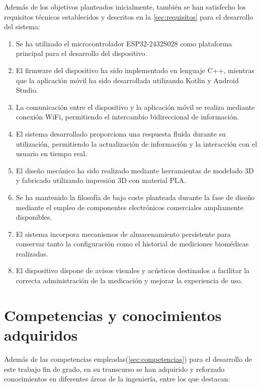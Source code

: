 Además de los objetivos planteados inicialmente, también se han satisfecho los requisitos técnicos establecidos y descritos en la \autoref{sec:requisitos} para el desarrollo del sistema:

\begin{enumerate}

\item Se ha utilizado el microcontrolador ESP32-2432S028 como plataforma principal para el desarrollo del dispositivo.

\item El firmware del dispositivo ha sido implementado en lenguaje C++, mientras que la aplicación móvil ha sido desarrollada utilizando Kotlin y Android Studio.

\item La comunicación entre el dispositivo y la aplicación móvil se realiza mediante conexión WiFi, permitiendo el intercambio bidireccional de información.

\item El sistema desarrollado proporciona una respuesta fluida durante su utilización, permitiendo la actualización de información y la interacción con el usuario en tiempo real.

\item El diseño mecánico ha sido realizado mediante herramientas de modelado 3D y fabricado utilizando impresión 3D con material PLA.

\item Se ha mantenido la filosofía de bajo coste planteada durante la fase de diseño mediante el empleo de componentes electrónicos comerciales ampliamente disponibles.

\item El sistema incorpora mecanismos de almacenamiento persistente para conservar tanto la configuración como el historial de mediciones biomédicas realizadas.

\item El dispositivo dispone de avisos visuales y acústicos destinados a facilitar la correcta administración de la medicación y mejorar la experiencia de uso.

\end{enumerate}

\section{Competencias y conocimientos adquiridos}

Además de las competencias empleadas(\autoref{sec:competencias}) para el desarrollo de este trabajo fin de grado, en su transcurso se han adquirido y reforzado conocimientos en diferentes áreas de la ingeniería, entre los que destacan:


